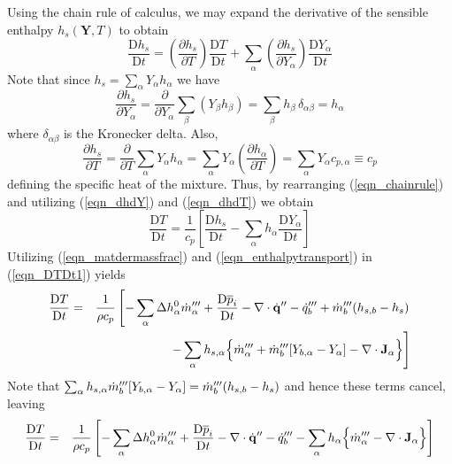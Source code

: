 \documentclass[11pt]{book}
\begin{document}
Using the chain rule of calculus, we may expand the derivative of the sensible enthalpy $h_s(\mathbf{Y},T)$ to obtain
\begin{equation}
\label{eqn_chainrule}
\frac{\mbox{D} h_s}{\mbox{D} t} = \left(\frac{\partial h_s}{\partial T}\right) \frac{\mbox{D} T }{\mbox{D} t} +
\sum_\alpha \left( \frac{\partial h_s}{\partial Y_\alpha} \right) \frac{\mbox{D} Y_\alpha }{\mbox{D} t}
\end{equation}
Note that since $h_s = \sum_\alpha Y_\alpha h_{\alpha}$ we have
\begin{equation}
\label{eqn_dhdY}
\frac{\partial h_s}{\partial Y_\alpha} = \frac{\partial}{\partial Y_\alpha} \sum_\beta (Y_\beta h_{\beta} )
= \sum_\beta h_{\beta} \,\delta_{\alpha \beta} = h_{\alpha}
\end{equation}
where $\delta_{\alpha \beta}$ is the Kronecker delta. Also,
\begin{equation}
\label{eqn_dhdT}
\frac{\partial h_s}{\partial T} = \frac{\partial}{\partial T} \sum_\alpha Y_\alpha h_{\alpha} =
\sum_\alpha Y_\alpha \left(\frac{\partial h_{\alpha}}{\partial T}\right) = \sum_\alpha Y_\alpha c_{p,\alpha} \equiv c_p
\end{equation}
defining the specific heat of the mixture.  Thus, by rearranging (\ref{eqn_chainrule}) and utilizing (\ref{eqn_dhdY}) and (\ref{eqn_dhdT}) we obtain
\begin{equation}
\label{eqn_DTDt1}
\frac{\mbox{D} T}{\mbox{D} t} = \frac{1}{c_p} \left[ \frac{\mbox{D} h_s}{\mbox{D} t} - \sum_\alpha h_{\alpha} \frac{\mbox{D} Y_\alpha}{\mbox{D} t} \right]
\end{equation}
Utilizing (\ref{eqn_matdermassfrac}) and (\ref{eqn_enthalpytransport}) in (\ref{eqn_DTDt1}) yields
\begin{eqnarray}
\frac{\mbox{D} T}{\mbox{D} t} &=& \frac{1}{\rho c_p}   \left[  -\sum_\alpha \Delta h^0_\alpha \dot{m}_{\alpha}^{\tripleprime} +
\frac{\mbox{D} \overline{p}_i }{\mbox{D} t} - \Div\dot{\mathbf{q}}^{\prime\prime} - \dq_b''' + \dot{m}_{b}^{\tripleprime} ( h_{s,b} - h_s )  \right.   \nonumber \vspace{0.3cm} \\
& &  \left.  - \sum_\alpha h_{s,\alpha} \Big\{  \dot{m}_\alpha^{\tripleprime} + \dot{m}_{b}^{\tripleprime}[Y_{b,\alpha} - Y_\alpha] - \Div \mathbf{J}_{\alpha} \Big\}  \right]
\label{eqn_DTDt2}
\end{eqnarray}
Note that $\sum_\alpha h_{s,\alpha} \dot{m}_{b}^{{\prime\prime\prime}}[Y_{b,\alpha} - Y_\alpha] = \dot{m}_{b}^{{\prime\prime\prime}} ( h_{s,b} - h_s )$ and hence these terms cancel, leaving
\begin{eqnarray}
\label{eqn_DTDt}
\frac{\mbox{D} T}{\mbox{D} t} &=& \frac{1}{\rho c_p} \left[ -\sum_\alpha \Delta h^0_\alpha \dot{m}_{\alpha}^{{\prime\prime\prime}} + \frac{\mbox{D} \overline{p}_i }{\mbox{D} t}
- \nabla\cdot\dot{\mathbf{q}}^{\prime\prime} - \dot{q}_b'''  - \sum_\alpha h_{\alpha} \Big\{  \dot{m}_\alpha^{{\prime\prime\prime}} - \nabla\cdot \mathbf{J}_{\alpha} \Big\} \right]
\end{eqnarray}
\end{document}
